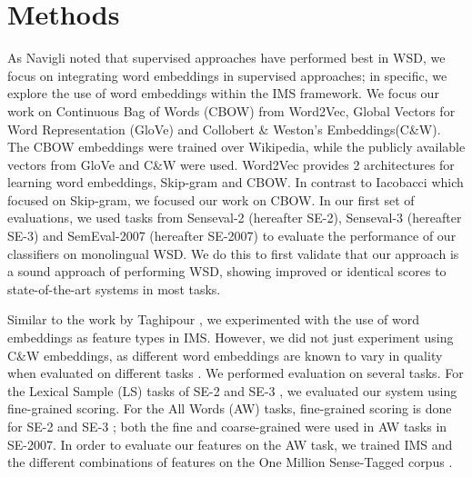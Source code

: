 \section{Methods}
\label{section:methods}

As Navigli  noted that supervised approaches have performed best in WSD, we focus on integrating word embeddings in supervised approaches; in specific,
we explore the use of word embeddings within the IMS framework. We focus our work on Continuous Bag of Words (CBOW) from Word2Vec,  Global Vectors for Word Representation (GloVe) and Collobert \& Weston's Embeddings(C\&W). The CBOW embeddings were trained over Wikipedia, while the publicly available vectors from GloVe and C\&W were used. Word2Vec provides 2 architectures for learning word embeddings, Skip-gram and CBOW. In contrast to Iacobacci  which focused on Skip-gram, we focused our work on CBOW.
In our first set of evaluations, we used tasks from Senseval-2 (hereafter SE-2), Senseval-3 (hereafter SE-3) and SemEval-2007 (hereafter SE-2007) to evaluate the performance of our classifiers on monolingual WSD. We do this to first validate that our approach is a sound approach of performing WSD, showing improved or identical scores to state-of-the-art systems in most tasks. 

Similar to the work by Taghipour , we experimented with the use of word embeddings as feature types in IMS. However, we did not just experiment using C\&W embeddings, as different word embeddings are known to vary in quality when evaluated on different tasks \cite{schnabel2015evaluation}. We performed evaluation on several tasks. For the Lexical Sample (LS) tasks of SE-2 \cite{senseval2-LS-kilgarriff2001} and SE-3 \cite{senseval3-LS-mihalcea2004}, we evaluated our system using fine-grained scoring. For the All Words (AW) tasks, fine-grained scoring is done for SE-2 \cite{senseval2-AW-palmer2001} and SE-3 \cite{senseval3-AW-snyder2004}; both the fine \cite{semeval2007-fine-pradhan2007} and coarse-grained were used in \cite{semeval2007-coarse-navigli2007} AW tasks in SE-2007. In order to evaluate our features on the AW task, we trained IMS and the different combinations of features on the One Million Sense-Tagged corpus \cite{taghipour2015one}.

